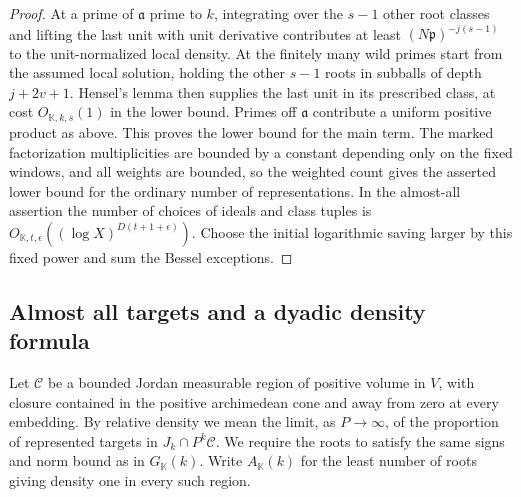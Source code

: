 \documentclass[11pt,letterpaper]{article}
\theoremstyle{definition}
\numberwithin{equation}{section}
\begin{document}
\begin{proof}
At a prime of $\mathfrak a$ prime to $k$, integrating over the
$s-1$ other root classes and lifting the last unit with unit derivative
contributes at least $(N\mathfrak p)^{-j(s-1)}$ to the unit-normalized
local density. At the finitely many wild primes start from the
assumed local solution, holding the other $s-1$ roots in subballs
of depth $j+2v+1$. Hensel's lemma then supplies the last unit in its
prescribed class, at cost $O_{\mathbb K,k,s}(1)$ in the lower
bound. Primes off $\mathfrak a$ contribute a uniform positive
product as above. This proves the lower bound for the main term.
The marked factorization multiplicities are bounded by a constant
depending only on the fixed windows, and all weights are bounded,
so the weighted count gives the asserted lower bound for the
ordinary number of representations. In the almost-all assertion
the number of choices of ideals and class tuples is
$O_{\mathbb K,t,\epsilon}((\log X)^{D(t+1+\epsilon)})$.
Choose the initial logarithmic saving larger by this fixed power
and sum the Bessel exceptions.
\end{proof}

\subsection{Almost all targets and a dyadic density formula}
\label{sec:nf-power-density}

Let $\mathcal C$ be a bounded Jordan measurable region of positive
volume in $V$, with closure contained in the positive archimedean
cone and away from zero at every embedding. By relative density
we mean the limit, as $P\to\infty$, of the proportion of represented
targets in $J_k\cap P^k\mathcal C$. We require the roots to satisfy
the same signs and norm bound as in $G_{\mathbb K}(k)$. Write
$A_{\mathbb K}(k)$ for the least number of roots giving density one
in every such region.
\end{document}
